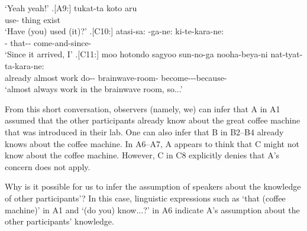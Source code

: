            `Yeah yeah!'
 \bg.[A9:] tukat-ta koto aru \\
        use- thing exist \\
        `Have (you) used (it)?'
 \bg.[C10:] atasi-sa: -ga-ne: ki-te-kara-ne: \\
         - that-- come-and-since- \\
         `Since it arrived, I'
 \bg.[C11:] moo hotondo sagyoo sun-no-ga nooha-beya-ni nat-tyat-ta-kara-ne: \\
           already almost work do-- brainwave-room- become---because- \\
           `almost always work in the brainwave room, so...'

From this short conversation,
observers (namely, we) can infer that
A in A1 assumed that the other participants already know about the great coffee machine that was introduced in their lab.
One can also infer that B in B2--B4 already knows about the coffee machine.
In A6--A7,
A appears to think that C might not know about the coffee machine.
However, C in C8 explicitly denies that A's concern does not apply.

Why is it possible for us to infer the assumption of speakers about the knowledge of other participants'?
In this case, linguistic expressions such as
 `that (coffee machine)' in A1 and
 `(do you) know...?' in A6
indicate A's assumption about the other participants' knowledge.

